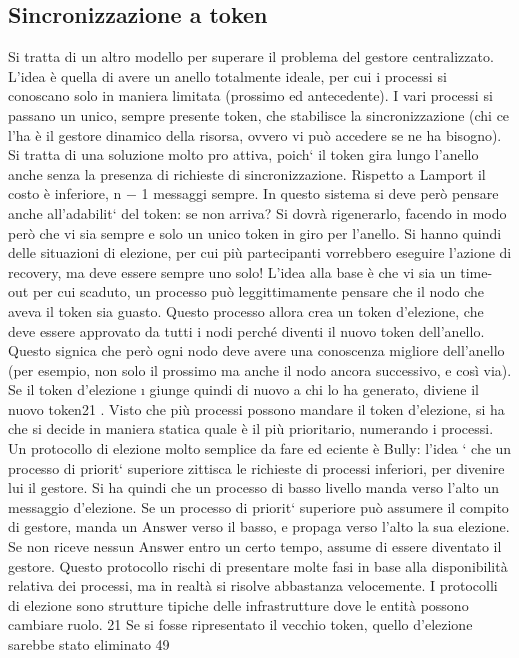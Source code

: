 \subsection{Sincronizzazione a token}
Si tratta di un altro modello per superare il problema del gestore centralizzato. L'idea è quella di avere un anello
totalmente ideale, per cui i processi si
conoscano solo in maniera limitata (prossimo ed antecedente). I vari processi
si passano un unico, sempre presente token, che stabilisce la sincronizzazione
(chi ce l'ha è il gestore dinamico della risorsa, ovvero vi può accedere se ne
ha bisogno). Si tratta di una soluzione molto pro attiva, poich` il token gira
lungo l'anello anche senza la presenza di richieste di sincronizzazione. Rispetto
a Lamport il costo è inferiore, n $-$ 1 messaggi sempre.
In questo sistema si deve però pensare anche all'adabilit` del token: se
non arriva? Si dovrà rigenerarlo, facendo in modo però che vi sia sempre e solo
un unico token in giro per l'anello. Si hanno quindi delle situazioni di elezione,
per cui più partecipanti vorrebbero eseguire l'azione di recovery, ma deve essere
sempre uno solo! L'idea alla base è che vi sia un time-out per cui scaduto, un
processo può leggittimamente pensare che il nodo che aveva il token sia guasto.
Questo processo allora crea un token d'elezione, che deve essere approvato da
tutti i nodi perché diventi il nuovo token dell'anello. Questo signica che però
ogni nodo deve avere una conoscenza migliore dell'anello (per esempio, non solo
il prossimo ma anche il nodo ancora successivo, e così via). Se il token d'elezione
\i{}
giunge quindi di nuovo a chi lo ha generato, diviene il nuovo token21 . Visto che
più processi possono mandare il token d'elezione, si ha che si decide in maniera
statica quale è il più prioritario, numerando i processi.
Un protocollo di elezione molto semplice da fare ed eciente è Bully: l'idea
` che un processo di priorit` superiore zittisca le richieste di processi inferiori,
per divenire lui il gestore. Si ha quindi che un processo di basso livello manda
verso l'alto un messaggio d'elezione. Se un processo di priorit` superiore può
assumere il compito di gestore, manda un Answer verso il basso, e propaga verso
l'alto la sua elezione. Se non riceve nessun Answer entro un certo tempo, assume
di essere diventato il gestore. Questo protocollo rischi di presentare molte fasi
in base alla disponibilità relativa dei processi, ma in realtà si risolve abbastanza
velocemente. I protocolli di elezione sono strutture tipiche delle infrastrutture
dove le entità possono cambiare ruolo.
21 Se
si fosse ripresentato il vecchio token, quello d'elezione sarebbe stato eliminato
49
